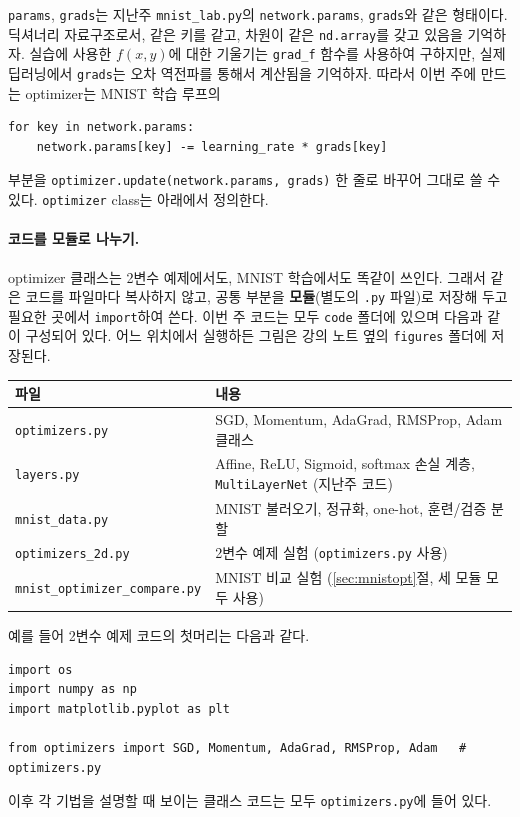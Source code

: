 \documentclass[11pt,a4paper]{article}
\begin{document}
\texttt{params}, \texttt{grads}는 지난주 \texttt{mnist\_lab.py}의 \texttt{network.params}, \texttt{grads}와 같은 형태이다. 딕셔너리 자료구조로서, 같은 키를 같고, 차원이 같은 \texttt{nd.array}를 갖고 있음을 기억하자.
실습에 사용한 $f(x,y)$에 대한 기울기는 \texttt{grad\_f} 함수를 사용하여 구하지만, 실제 딥러닝에서 \texttt{grads}는 오차 역전파를 통해서 계산됨을 기억하자. 따라서 이번 주에 만드는 optimizer는 MNIST 학습 루프의
\begin{lstlisting}
for key in network.params:
    network.params[key] -= learning_rate * grads[key]
\end{lstlisting}
부분을 \texttt{optimizer.update(network.params, grads)} 한 줄로 바꾸어 그대로 쓸 수 있다. \texttt{optimizer} class는 아래에서 정의한다.

\paragraph{코드를 모듈로 나누기.}
optimizer 클래스는 2변수 예제에서도, MNIST 학습에서도 똑같이 쓰인다.
그래서 같은 코드를 파일마다 복사하지 않고, 공통 부분을 \textbf{모듈}(별도의 \texttt{.py} 파일)로 저장해 두고
필요한 곳에서 \texttt{import}하여 쓴다.
이번 주 코드는 모두 \texttt{code} 폴더에 있으며 다음과 같이 구성되어 있다.
어느 위치에서 실행하든 그림은 강의 노트 옆의 \texttt{figures} 폴더에 저장된다.

\begin{center}
\begin{tabular}{@{}lp{}@{}}
\toprule
파일 & 내용 \\
\midrule
\texttt{optimizers.py} & SGD, Momentum, AdaGrad, RMSProp, Adam 클래스 \\
\texttt{layers.py} & Affine, ReLU, Sigmoid, softmax 손실 계층, \texttt{MultiLayerNet} (지난주 코드) \\
\texttt{mnist\_data.py} & MNIST 불러오기, 정규화, one-hot, 훈련/검증 분할 \\
\midrule
\texttt{optimizers\_2d.py} & 2변수 예제 실험 (\texttt{optimizers.py} 사용) \\
\texttt{mnist\_optimizer\_compare.py} & MNIST 비교 실험 (\ref{sec:mnistopt}절, 세 모듈 모두 사용) \\
\bottomrule
\end{tabular}
\end{center}

예를 들어 2변수 예제 코드의 첫머리는 다음과 같다.
\begin{lstlisting}
import os
import numpy as np
import matplotlib.pyplot as plt

from optimizers import SGD, Momentum, AdaGrad, RMSProp, Adam   # optimizers.py
\end{lstlisting}
이후 각 기법을 설명할 때 보이는 클래스 코드는 모두 \texttt{optimizers.py}에 들어 있다.
\end{document}

